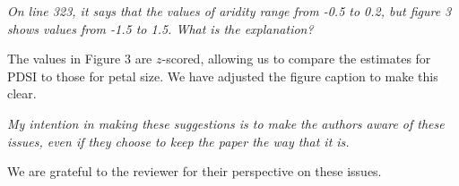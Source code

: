 \documentclass{article}[12pt]
\begin{document}
\emph{On line 323, it says that the values of aridity range from -0.5 to 0.2, but figure 3 shows values from -1.5 to 1.5. What is the explanation?}

The values in Figure 3 are $z$-scored, allowing us to compare the estimates for PDSI to those for petal size. We have adjusted the figure caption to make this clear.


\emph{My intention in making these suggestions is to make the authors aware of these issues, even if they choose to keep the paper the way that it is.}

We are grateful to the reviewer for their perspective on these issues.%
\end{document}
